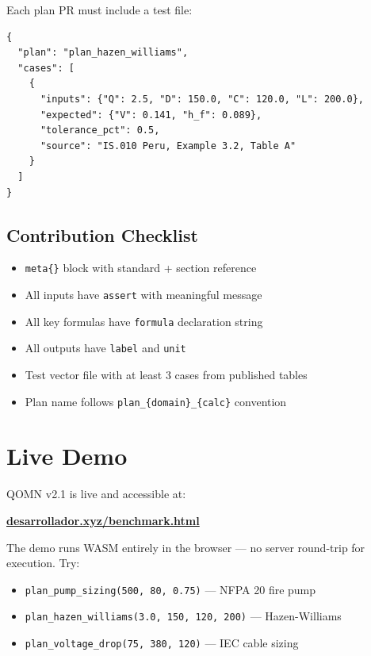 \documentclass[12pt,a4paper]{article}
\begin{document}
Each plan PR must include a test file:

\begin{lstlisting}[caption=Test vector format — datasets/tests/plan\_name.json]
{
  "plan": "plan_hazen_williams",
  "cases": [
    {
      "inputs": {"Q": 2.5, "D": 150.0, "C": 120.0, "L": 200.0},
      "expected": {"V": 0.141, "h_f": 0.089},
      "tolerance_pct": 0.5,
      "source": "IS.010 Peru, Example 3.2, Table A"
    }
  ]
}
\end{lstlisting}

\subsection{Contribution Checklist}

\begin{itemize}
  \item[$\square$] \texttt{meta\{\}} block with standard + section reference
  \item[$\square$] All inputs have \texttt{assert} with meaningful message
  \item[$\square$] All key formulas have \texttt{formula} declaration string
  \item[$\square$] All outputs have \texttt{label} and \texttt{unit}
  \item[$\square$] Test vector file with at least 3 cases from published tables
  \item[$\square$] Plan name follows \texttt{plan\_\{domain\}\_\{calc\}} convention
\end{itemize}

\section{Live Demo}

QOMN v2.1 is live and accessible at:
\begin{center}
  \href{https://desarrollador.xyz/benchmark.html}{\textbf{desarrollador.xyz/benchmark.html}}
\end{center}

The demo runs WASM entirely in the browser — no server round-trip for execution.
Try:
\begin{itemize}
  \item \texttt{plan\_pump\_sizing(500, 80, 0.75)} — NFPA 20 fire pump
  \item \texttt{plan\_hazen\_williams(3.0, 150, 120, 200)} — Hazen-Williams
  \item \texttt{plan\_voltage\_drop(75, 380, 120)} — IEC cable sizing
\end{itemize}
\end{document}

